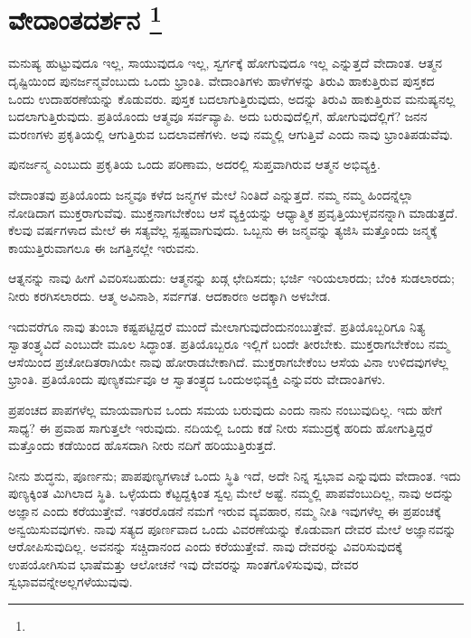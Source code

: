 
\chapter[ವೇದಾಂತದರ್ಶನ]{ವೇದಾಂತದರ್ಶನ \protect\footnote{}}

ಮನುಷ್ಯ ಹುಟ್ಟುವುದೂ ಇಲ್ಲ, ಸಾಯುವುದೂ ಇಲ್ಲ, ಸ್ವರ್ಗಕ್ಕೆ ಹೋಗುವುದೂ ಇಲ್ಲ ಎನ್ನುತ್ತದೆ ವೇದಾಂತ. ಆತ್ಮನ ದೃಷ್ಟಿಯಿಂದ ಪುನರ್ಜನ್ಮವೆಂಬುದು ಒಂದು ಭ್ರಾಂತಿ. ವೇದಾಂತಿಗಳು ಹಾಳೆಗಳನ್ನು ತಿರುವಿ ಹಾಕುತ್ತಿರುವ ಪುಸ್ತಕದ ಒಂದು ಉದಾಹರಣೆಯನ್ನು ಕೊಡುವರು. ಪುಸ್ತಕ ಬದಲಾಗುತ್ತಿರುವುದು, ಅದನ್ನು ತಿರುವಿ ಹಾಕುತ್ತಿರುವ ಮನುಷ್ಯನಲ್ಲ ಬದಲಾಗುತ್ತಿರುವುದು. ಪ್ರತಿಯೊಂದು ಆತ್ಮವೂ ಸರ್ವವ್ಯಾಪಿ. ಅದು ಬರುವುದೆಲ್ಲಿಗೆ, ಹೋಗುವುದೆಲ್ಲಿಗೆ? ಜನನ ಮರಣಗಳು ಪ್ರಕೃತಿಯಲ್ಲಿ ಆಗುತ್ತಿರುವ ಬದಲಾವಣೆಗಳು. ಅವು ನಮ್ಮಲ್ಲಿ ಆಗುತ್ತಿವೆ ಎಂದು ನಾವು ಭ್ರಾಂತಿಪಡುವೆವು.

ಪುನರ್ಜನ್ಮ ಎಂಬುದು ಪ್ರಕೃತಿಯ ಒಂದು ಪರಿಣಾಮ, ಅದರಲ್ಲಿ ಸುಪ್ತವಾಗಿರುವ ಆತ್ಮನ ಅಭಿವ್ಯಕ್ತಿ.

ವೇದಾಂತವು ಪ್ರತಿಯೊಂದು ಜನ್ಮವೂ ಕಳೆದ ಜನ್ಮಗಳ ಮೇಲೆ ನಿಂತಿದೆ ಎನ್ನುತ್ತದೆ. ನಮ್ಮ ನಮ್ಮ ಹಿಂದನ್ನೆಲ್ಲಾ ನೋಡಿದಾಗ ಮುಕ್ತರಾಗುವೆವು. ಮುಕ್ತನಾಗಬೇಕೆಂಬ ಆಸೆ ವ್ಯಕ್ತಿಯನ್ನು ಆಧ್ಯಾತ್ಮಿಕ ಪ್ರವೃತ್ತಿಯುಳ್ಳವನನ್ನಾಗಿ ಮಾಡುತ್ತದೆ. ಕೆಲವು ವರ್ಷಗಳಾದ ಮೇಲೆ ಈ ಸತ್ಯವೆಲ್ಲ ಸ್ಪಷ್ಟವಾಗುವುದು. ಒಬ್ಬನು ಈ ಜನ್ಮವನ್ನು ತ್ಯಜಿಸಿ ಮತ್ತೊಂದು ಜನ್ಮಕ್ಕೆ ಕಾಯುತ್ತಿರುವಾಗಲೂ ಈ ಜಗತ್ತಿನಲ್ಲೇ ಇರುವನು.

ಆತ್ನನನ್ನು ನಾವು ಹೀಗೆ ವಿವರಿಸಬಹುದು: ಆತ್ಮನನ್ನು ಖಡ್ಗ ಛೇದಿಸದು; ಭರ್ಜಿ ಇರಿಯಲಾರದು; ಬೆಂಕಿ ಸುಡಲಾರದು; ನೀರು ಕರಗಿಸಲಾರದು. ಆತ್ಮ ಅವಿನಾಶಿ, ಸರ್ವಗತ. ಆದಕಾರಣ ಅದಕ್ಕಾಗಿ ಅಳಬೇಡ.

ಇದುವರೆಗೂ ನಾವು ತುಂಬಾ ಕಷ್ಟಪಟ್ಟಿದ್ದರೆ ಮುಂದೆ ಮೇಲಾಗುವುದೆಂದು\break ನಂಬುತ್ತೇವೆ. ಪ್ರತಿಯೊಬ್ಬರಿಗೂ ನಿತ್ಯ ಸ್ವಾತಂತ್ರ್ಯವಿದೆ ಎಂಬುದೇ ಮೂಲ ಸಿದ್ಧಾಂತ. ಪ್ರತಿಯೊಬ್ಬರೂ ಇಲ್ಲಿಗೆ ಬಂದೇ ತೀರಬೇಕು. ಮುಕ್ತರಾಗಬೇಕೆಂಬ ನಮ್ಮ ಆಸೆಯಿಂದ ಪ್ರಚೋದಿತರಾಗಿಯೇ ನಾವು ಹೋರಾಡಬೇಕಾಗಿದೆ. ಮುಕ್ತರಾಗಬೇಕೆಂಬ ಆಸೆಯ ವಿನಾ ಉಳಿದವುಗಳೆಲ್ಲ ಭ್ರಾಂತಿ. ಪ್ರತಿಯೊಂದು ಪುಣ್ಯಕರ್ಮವೂ ಆ ಸ್ವಾತಂತ್ರ್ಯದ ಒಂದು\break ಅಭಿವ್ಯಕ್ತಿ ಎನ್ನುವರು ವೇದಾಂತಿಗಳು.

ಪ್ರಪಂಚದ ಪಾಪಗಳೆಲ್ಲ ಮಾಯವಾಗುವ ಒಂದು ಸಮಯ ಬರುವುದು ಎಂದು ನಾನು ನಂಬುವುದಿಲ್ಲ. ಇದು ಹೇಗೆ ಸಾಧ್ಯ? ಈ ಪ್ರವಾಹ ಸಾಗುತ್ತಲೇ ಇರುವುದು. ನದಿಯಲ್ಲಿ ಒಂದು ಕಡೆ ನೀರು ಸಮುದ್ರಕ್ಕೆ ಹರಿದು ಹೋಗುತ್ತಿದ್ದರೆ ಮತ್ತೊಂದು ಕಡೆಯಿಂದ ಹೊಸದಾಗಿ ನೀರು ನದಿಗೆ ಹರಿಯುತ್ತಿರುತ್ತದೆ.

ನೀನು ಶುದ್ಧನು, ಪೂರ್ಣನು; ಪಾಪಪುಣ್ಯಗಳಾಚೆ ಒಂದು ಸ್ಥಿತಿ ಇದೆ, ಅದೇ ನಿನ್ನ ಸ್ವಭಾವ ಎನ್ನುವುದು ವೇದಾಂತ. ಇದು ಪುಣ್ಯಕ್ಕಿಂತ ಮಿಗಿಲಾದ ಸ್ಥಿತಿ. ಒಳ್ಳೆಯದು ಕೆಟ್ಟದ್ದಕ್ಕಿಂತ ಸ್ವಲ್ಪ ಮೇಲೆ ಅಷ್ಟೆ. ನಮ್ಮಲ್ಲಿ ಪಾಪವೆಂಬುದಿಲ್ಲ, ನಾವು ಅದನ್ನು ಅಜ್ಞಾನ ಎಂದು ಕರೆಯುತ್ತೇವೆ. ಇತರರೊಡನೆ ನಮಗೆ ಇರುವ ವ್ಯವಹಾರ, ನಮ್ಮ ನೀತಿ ಇವುಗಳೆಲ್ಲ ಈ ಪ್ರಪಂಚಕ್ಕೆ ಅನ್ವಯಿಸುವವುಗಳು. ನಾವು ಸತ್ಯದ ಪೂರ್ಣವಾದ ಒಂದು ವಿವರಣೆಯನ್ನು ಕೊಡುವಾಗ ದೇವರ ಮೇಲೆ ಅಜ್ಞಾನವನ್ನು ಆರೋಪಿಸುವುದಿಲ್ಲ. ಅವನನ್ನು ಸಚ್ಚಿದಾನಂದ ಎಂದು ಕರೆಯುತ್ತೇವೆ. ನಾವು ದೇವರನ್ನು ವಿವರಿಸುವುದಕ್ಕೆ ಉಪಯೋಗಿಸುವ ಭಾಷೆ\break ಮತ್ತು ಆಲೋಚನೆ ಇವು ದೇವರನ್ನು ಸಾಂತಗೊಳಿಸುವುವು, ದೇವರ ಸ್ವಭಾವವನ್ನೇ\break ಅಲ್ಲಗಳೆಯುವುವು.

